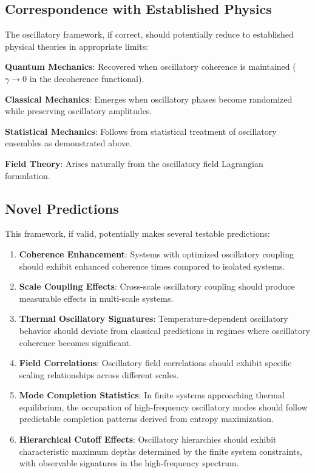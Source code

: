 \documentclass[11pt]{article}
\theoremstyle{remark}
\begin{document}
\subsection{Correspondence with Established Physics}

The oscillatory framework, if correct, should potentially reduce to established physical theories in appropriate limits:

\textbf{Quantum Mechanics}: Recovered when oscillatory coherence is maintained ($\gamma \to 0$ in the decoherence functional).

\textbf{Classical Mechanics}: Emerges when oscillatory phases become randomized while preserving oscillatory amplitudes.

\textbf{Statistical Mechanics}: Follows from statistical treatment of oscillatory ensembles as demonstrated above.

\textbf{Field Theory}: Arises naturally from the oscillatory field Lagrangian formulation.

\subsection{Novel Predictions}

This framework, if valid, potentially makes several testable predictions:

\begin{enumerate}
\item \textbf{Coherence Enhancement}: Systems with optimized oscillatory coupling should exhibit enhanced coherence times compared to isolated systems.

\item \textbf{Scale Coupling Effects}: Cross-scale oscillatory coupling should produce measurable effects in multi-scale systems.

\item \textbf{Thermal Oscillatory Signatures}: Temperature-dependent oscillatory behavior should deviate from classical predictions in regimes where oscillatory coherence becomes significant.

\item \textbf{Field Correlations}: Oscillatory field correlations should exhibit specific scaling relationships across different scales.

\item \textbf{Mode Completion Statistics}: In finite systems approaching thermal equilibrium, the occupation of high-frequency oscillatory modes should follow predictable completion patterns derived from entropy maximization.

\item \textbf{Hierarchical Cutoff Effects}: Oscillatory hierarchies should exhibit characteristic maximum depths determined by the finite system constraints, with observable signatures in the high-frequency spectrum.
\end{enumerate}
\end{document}
